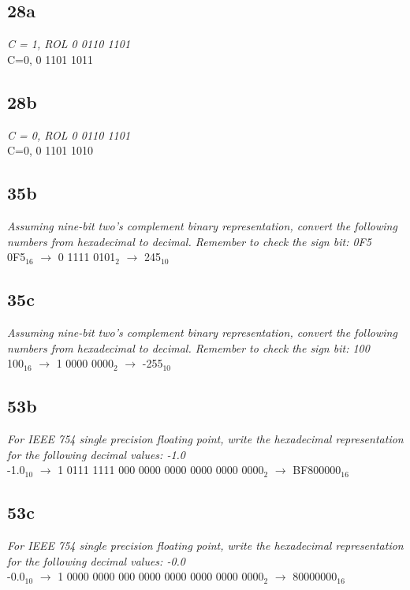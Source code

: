 \documentclass[a4paper,man,natbib]{apa6}
\begin{document}
\subsection{28a}
\emph{C = 1, ROL 0 0110 1101} \\
C=0, 0 1101 1011 \\
\subsection{28b}
\emph{C = 0, ROL 0 0110 1101} \\
C=0, 0 1101 1010 \\
\subsection{35b}
\emph{Assuming nine-bit two's complement binary representation, convert the following numbers from hexadecimal to decimal. Remember to check the sign bit: 0F5} \\
0F5$_{16}$ $\rightarrow$ 0 1111 0101$_{2}$ $\rightarrow$ 245$_{10}$
\subsection{35c}
\emph{Assuming nine-bit two's complement binary representation, convert the following numbers from hexadecimal to decimal. Remember to check the sign bit: 100} \\
100$_{16}$ $\rightarrow$ 1 0000 0000$_{2}$ $\rightarrow$ -255$_{10}$
\subsection{53b}
\emph{For IEEE 754 single precision floating point, write the hexadecimal representation for the following decimal values: -1.0} \\
-1.0$_{10}$ $\rightarrow$ 1 0111 1111 000 0000 0000 0000 0000 0000$_{2}$ $\rightarrow$ BF800000$_{16}$
\subsection{53c}
\emph{For IEEE 754 single precision floating point, write the hexadecimal representation for the following decimal values: -0.0} \\
-0.0$_{10}$ $\rightarrow$ 1 0000 0000 000 0000 0000 0000 0000 0000$_{2}$ $\rightarrow$ 80000000$_{16}$

\nocite{warford10}

\end{document}
